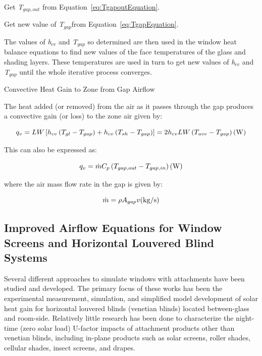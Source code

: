 Get \emph{T\(_{gap,out}\)} from Equation~\ref{eq:TgapoutEquation}.

Get new value of \emph{T\(_{gap}\)}from Equation~\ref{eq:TgapEquation}.

The values of \emph{h\(_{cv}\)} and \emph{T\(_{gap}\)} so determined are then used in the window heat balance equations to find new values of the face temperatures of the glass and shading layers. These temperatures are used in turn to get new values of \emph{h\(_{cv}\)} and \emph{T\(_{gap}\)} until the whole iterative process converges.

Convective Heat Gain to Zone from Gap Airflow

The heat added (or removed) from the air as it passes through the gap produces a convective gain (or loss) to the zone air given by:

\begin{equation}
{q_v} = LW\left[ {{h_{cv}}\left( {{T_{gl}} - {T_{gap}}} \right) + {h_{cv}}\left( {{T_{sh}} - {T_{gap}}} \right)} \right] = 2{h_{cv}}LW\left( {{T_{ave}} - {T_{gap}}} \right){\rm{    (W)}}
\end{equation}

This can also be expressed as:

\begin{equation}
{q_v} = \dot m{C_p}\left( {{T_{gap,out}} - {T_{gap,in}}} \right){\rm{    (W)}}
\end{equation}

where the air mass flow rate in the gap is given by:

\begin{equation}
\dot m = \rho {A_{gap}}v{\rm{    (kg/s)}}
\end{equation}

\subsection{Improved Airflow Equations for Window Screens and Horizontal Louvered Blind Systems}
Several different approaches to simulate windows with attachments have been studied and developed. The primary focus of these works has been the experimental measurement, simulation, and simplified model development of solar heat gain for horizontal louvered blinds (venetian blinds) located between-glass and room-side. Relatively little research has been done to characterize the night-time (zero solar load) U-factor impacts of attachment products other than venetian blinds, including in-plane products such as solar screens, roller shades, cellular shades, insect screens, and drapes.

